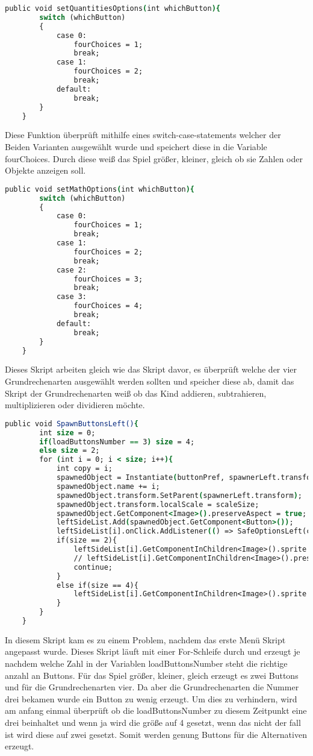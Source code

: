 \begin{lstlisting}[language=csh, caption={MenuPickLevelAdvanced.cs setQuantitiesOptions Funktion}]
	public void setQuantitiesOptions(int whichButton){
		switch (whichButton)
		{
			case 0:
				fourChoices = 1;
				break;
			case 1:
				fourChoices = 2;
				break;
			default:
				break;
		}
	}
\end{lstlisting}
Diese Funktion überprüft mithilfe eines switch-case-statements welcher der Beiden Varianten ausgewählt wurde und speichert diese in die Variable fourChoices. Durch diese weiß das Spiel größer, kleiner, gleich ob sie Zahlen oder Objekte anzeigen soll.
\begin{lstlisting}[language=csh, caption={MenuPickLevelAdvanced.cs setMathOptions Funktion}]
	public void setMathOptions(int whichButton){
		switch (whichButton)
		{
			case 0:
				fourChoices = 1;
				break;
			case 1:
				fourChoices = 2;
				break;
			case 2:
				fourChoices = 3;
				break;
			case 3:
				fourChoices = 4;
				break;
			default:
				break;
		}
	}
\end{lstlisting}
Dieses Skript arbeiten gleich wie das Skript davor, es überprüft welche der vier Grundrechenarten ausgewählt werden sollten und speicher diese ab, damit das Skript der Grundrechenarten weiß ob das Kind addieren, subtrahieren, multiplizieren oder dividieren möchte.
\begin{lstlisting}[language=csh, caption={MenuPickLevelAdvanced.cs SpawnButtonsLeft Funktion}]
	public void SpawnButtonsLeft(){
		int size = 0;
		if(loadButtonsNumber == 3) size = 4;
		else size = 2;
		for (int i = 0; i < size; i++){
			int copy = i;
			spawnedObject = Instantiate(buttonPref, spawnerLeft.transform.position, Quaternion.identity);
			spawnedObject.name += i;
			spawnedObject.transform.SetParent(spawnerLeft.transform);
			spawnedObject.transform.localScale = scaleSize;
			spawnedObject.GetComponent<Image>().preserveAspect = true;
			leftSideList.Add(spawnedObject.GetComponent<Button>());
			leftSideList[i].onClick.AddListener(() => SafeOptionsLeft(copy));
			if(size == 2){
				leftSideList[i].GetComponentInChildren<Image>().sprite = quantitiesModes[i];
				// leftSideList[i].GetComponentInChildren<Image>().preserveAspect = true;
				continue;
			}
			else if(size == 4){
				leftSideList[i].GetComponentInChildren<Image>().sprite = mathModes[i];
			}
		}
	}
\end{lstlisting}
In diesem Skript kam es zu einem Problem, nachdem das erste Menü Skript angepasst wurde. Dieses Skript läuft mit einer For-Schleife durch und erzeugt je nachdem welche Zahl in der Variablen loadButtonsNumber steht die richtige anzahl an Buttons. Für das Spiel größer, kleiner, gleich erzeugt es zwei Buttons und für die Grundrechenarten vier. Da aber die Grundrechenarten die Nummer drei bekamen wurde ein Button zu wenig erzeugt. Um dies zu verhindern, wird am anfang einmal überprüft ob die loadButtonsNumber zu diesem Zeitpunkt eine drei beinhaltet und wenn ja wird die größe auf 4 gesetzt, wenn das nicht der fall ist wird diese auf zwei gesetzt. Somit werden genung Buttons für die Alternativen erzeugt.\\

